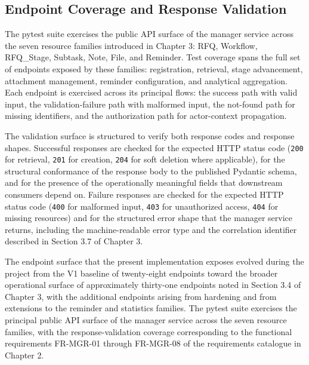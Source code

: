 \subsection{Endpoint Coverage and Response Validation}
The pytest suite exercises the public API surface of the manager service across the seven resource families introduced in Chapter 3: RFQ, Workflow, RFQ\_Stage, Subtask, Note, File, and Reminder. Test coverage spans the full set of endpoints exposed by these families: registration, retrieval, stage advancement, attachment management, reminder configuration, and analytical aggregation. Each endpoint is exercised across its principal flows: the success path with valid input, the validation-failure path with malformed input, the not-found path for missing identifiers, and the authorization path for actor-context propagation.

The validation surface is structured to verify both response codes and response shapes. Successful responses are checked for the expected HTTP status code (\texttt{200} for retrieval, \texttt{201} for creation, \texttt{204} for soft deletion where applicable), for the structural conformance of the response body to the published Pydantic schema, and for the presence of the operationally meaningful fields that downstream consumers depend on. Failure responses are checked for the expected HTTP status code (\texttt{400} for malformed input, \texttt{403} for unauthorized access, \texttt{404} for missing resources) and for the structured error shape that the manager service returns, including the machine-readable error type and the correlation identifier described in Section 3.7 of Chapter 3.

The endpoint surface that the present implementation exposes evolved during the project from the V1 baseline of twenty-eight endpoints toward the broader operational surface of approximately thirty-one endpoints noted in Section 3.4 of Chapter 3, with the additional endpoints arising from hardening and from extensions to the reminder and statistics families. The pytest suite exercises the principal public API surface of the manager service across the seven resource families, with the response-validation coverage corresponding to the functional requirements FR-MGR-01 through FR-MGR-08 of the requirements catalogue in Chapter 2.

